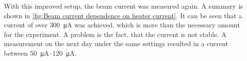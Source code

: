 %		
%	

With this improved setup, the beam current was measured again. A summary is shown in \cref{fig:Beam current dependence on heater current}. It can be seen that a current of over \SI{300}{\micro\ampere} was achieved, which is more than the necessary amount for the experiment. A problem is the fact, that the current is not stable. A measurement on the next day under the same settings resulted in a current between \SIrange{50}{120}{\micro\ampere}.


%		
%	
